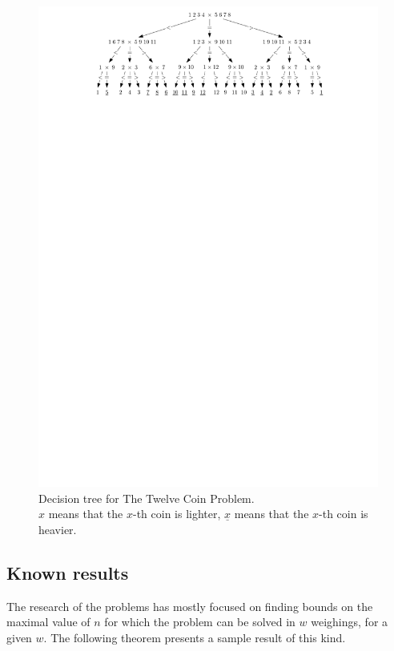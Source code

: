 \begin{figure}[ht]
\includegraphics[width=\textwidth]{pictures/coins12.pdf}
\caption{Decision tree for The Twelve Coin Problem. \\
$x$ means that the $x$-th coin is lighter, $\underline{x}$ means that
the $x$-th coin is heavier.}
\label{fig:coins12tree}
\end{figure}

\subsection{Known results}

The research of the problems has mostly focused
  on finding bounds on the maximal value of $n$
  for which the problem can be solved in $w$ weighings, for a given $w$.
The following theorem presents a sample result of this kind.

